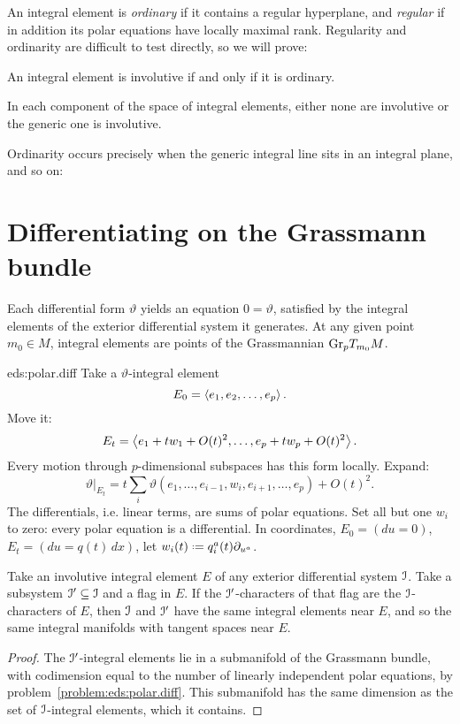 An integral element is \emph{ordinary} if it contains a regular hyperplane, and \emph{regular} if in addition its polar equations have locally maximal rank.
Regularity and ordinarity are difficult to test directly, so we will prove:
\begin{theorem}\label{theorem:test}
An integral element is involutive if and only if it is ordinary.
\end{theorem}
\begin{corollary}
In each component of the space of integral elements, either none are involutive or the generic one is involutive.
\end{corollary}
Ordinarity occurs precisely when the generic integral line sits in an integral plane, and so on:
\section{Differentiating on the Grassmann bundle}
Each differential form \(\vartheta\) yields an equation \(0=\vartheta\), satisfied by the integral elements of the exterior differential system it generates.
At any given point \(m_0 \in M\), integral elements are points of the Grassmannian \(\operatorname{Gr}_{p}\!T_{m_0} M\).
\begin{answer}{eds:polar.diff}
Take a \(\vartheta\)-integral element 
\[
E_0=\left<e_1,e_2,\dots,e_p\right>.
\]
Move it:
\[
E_t=\left<e_1+tw_1+O(t)^2,\dots,e_p+tw_p+O(t)^2\right>.
\]
Every motion through \(p\)-dimensional subspaces has this form locally.
Expand:
\[
\left.\vartheta\right|_{E_t}=t\sum_i \vartheta(e_1,\dots,e_{i-1},w_i,e_{i+1},\dots,e_p)+O(t)^2.
\]
The differentials, i.e. linear terms, are sums of polar equations.
Set all but one \(w_i\) to zero: every polar equation is a differential.
In coordinates, \(E_0=(du=0)\), \(E_t=(du=q(t) \, dx)\), let \(w_i(t)\defeq q^a_i(t)\p{u^a}\).
\end{answer}
\begin{corollary}\label{corollary:same.int.elts}
Take an involutive integral element \(E\) of any exterior differential system \(\mathcal{I}\).
Take a subsystem \(\mathcal{I}'\subseteq\mathcal{I}\) and a flag in \(E\).
If the \(\mathcal{I}'\)-characters of that flag are the \(\mathcal{I}\)-characters of \(E\), then \(\mathcal{I}\) and \(\mathcal{I}'\) have the same integral elements near \(E\), and so the same integral manifolds with tangent spaces near \(E\).
\end{corollary}
\begin{proof}
The \(\mathcal{I}'\)-integral elements lie in a submanifold of the Grassmann bundle, with codimension equal to the number of linearly independent polar equations, by problem~\vref{problem:eds:polar.diff}.
This submanifold has the same dimension as the set of \(\mathcal{I}\)-integral elements, which it contains.
\end{proof}

